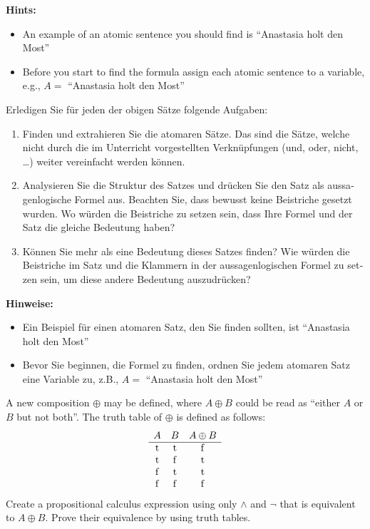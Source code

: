 \documentclass[12pt,a4paper]{exam}
\begin{document}
\begin{questions}
{\bf Hints: }
\begin{itemize}
  \item An example of an atomic sentence you should find is ``Anastasia holt den Most''
  \item Before you start to find the formula assign each atomic sentence to a variable, e.g., $A = $ ``Anastasia holt den Most''
\end{itemize}

\begin{otherlanguage}{german}
  Erledigen Sie für jeden der obigen Sätze folgende Aufgaben:
\begin{enumerate}
  \item Finden und extrahieren Sie die atomaren Sätze. Das sind die Sätze, welche nicht durch die im Unterricht vorgestellten Verknüpfungen (und, oder, nicht, \dots) weiter vereinfacht werden können.
  \item Analysieren Sie die Struktur des Satzes und drücken Sie den Satz als aussagenlogische Formel aus. Beachten Sie, dass bewusst keine Beistriche gesetzt wurden. Wo würden die Beistriche zu setzen sein, dass Ihre Formel und der Satz die gleiche Bedeutung haben?
  \item Können Sie mehr als eine Bedeutung dieses Satzes finden? Wie würden die Beistriche im Satz und die Klammern in der aussagenlogischen Formel zu setzen sein, um diese andere Bedeutung auszudrücken?
\end{enumerate}
\end{otherlanguage}

{\bf Hinweise: }
\begin{itemize}
  \item Ein Beispiel für einen atomaren Satz, den Sie finden sollten, ist ``Anastasia holt den Most''
  \item Bevor Sie beginnen, die Formel zu finden, ordnen Sie jedem atomaren Satz eine Variable zu, z.B., $A = $ ``Anastasia holt den Most''
\end{itemize}


A new composition $\oplus$ may be defined, where $A \oplus B$ could be read as “either $A$ or $B$ but not both”. The truth table of $\oplus$ is defined as follows:
\[
\begin{array}{c@{\quad}c@{\quad}c}
A & B & A \oplus B\\\hline
\mathrm{t} & \mathrm{t} & \mathrm{f}\\
\mathrm{t} & \mathrm{f} & \mathrm{t}\\
\mathrm{f} & \mathrm{t} & \mathrm{t}\\
\mathrm{f} & \mathrm{f} & \mathrm{f}
\end{array}
\]
Create a propositional calculus expression using only $\land$ and $\neg$ that is
equivalent to $A \oplus B$. Prove their equivalence by using truth tables.


\end{questions}
\end{document}
